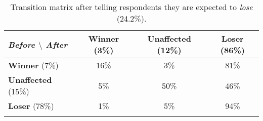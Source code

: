 \documentclass[12pt]{article} %
\begin{document}
\begin{appendices}
\vspace{1cm}

\begin{table}[H]
\caption[table]{Transition matrix after telling respondents they are expected to \textit{lose} (24.2\%).}
{\label{table:transition_matrix_negative_feedback}}
\centering
\begin{tabular}{lccc}
\textit{Before $\setminus$ After} & \textbf{Winner} (3\%) & \textbf{Unaffected} (12\%) & \textbf{Loser} (86\%) \\
\hline
\textbf{Winner} (7\%) & 16\% & 3\% & 81\% \\
\textbf{Unaffected} (15\%) & 5\% & 50\% & 46\% \\
\textbf{Loser} (78\%) & 1\% & 5\% & 94\% \\ \\
\end{tabular}
\end{table}

\vspace{1.5cm}





\end{appendices}
\end{document}
